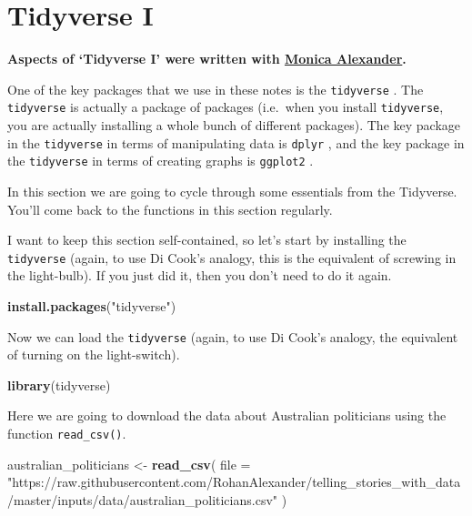 \documentclass[
]{book}
\newenvironment{Shaded}{\begin{snugshade}}{\end{snugshade}}
\newcommand{\DataTypeTok}[1]{\textcolor[rgb]{0.13,0.29,0.53}{#1}}
\newcommand{\KeywordTok}[1]{\textcolor[rgb]{0.13,0.29,0.53}{\textbf{#1}}}
\newcommand{\NormalTok}[1]{#1}
\newcommand{\StringTok}[1]{\textcolor[rgb]{0.31,0.60,0.02}{#1}}
\begin{document}
\hypertarget{tidyverse-i}{%
\section{Tidyverse I}\label{tidyverse-i}}

\textbf{Aspects of `Tidyverse I' were written with \href{https://www.monicaalexander.com/}{Monica Alexander}.}

One of the key packages that we use in these notes is the \texttt{tidyverse} \citet{tidyverse}. The \texttt{tidyverse} is actually a package of packages (i.e.~when you install \texttt{tidyverse}, you are actually installing a whole bunch of different packages). The key package in the \texttt{tidyverse} in terms of manipulating data is \texttt{dplyr} \citet{citedplyr}, and the key package in the \texttt{tidyverse} in terms of creating graphs is \texttt{ggplot2} \citet{citeggplot}.

In this section we are going to cycle through some essentials from the Tidyverse. You'll come back to the functions in this section regularly.

I want to keep this section self-contained, so let's start by installing the \texttt{tidyverse} (again, to use Di Cook's analogy, this is the equivalent of screwing in the light-bulb). If you just did it, then you don't need to do it again.

\begin{Shaded}
\begin{Highlighting}[]
\KeywordTok{install.packages}\NormalTok{(}\StringTok{"tidyverse"}\NormalTok{)}
\end{Highlighting}
\end{Shaded}

Now we can load the \texttt{tidyverse} (again, to use Di Cook's analogy, the equivalent of turning on the light-switch).

\begin{Shaded}
\begin{Highlighting}[]
\KeywordTok{library}\NormalTok{(tidyverse)}
\end{Highlighting}
\end{Shaded}

Here we are going to download the data about Australian politicians using the function \texttt{read\_csv()}.

\begin{Shaded}
\begin{Highlighting}[]
\NormalTok{australian_politicians <-}\StringTok{ }
\StringTok{  }\KeywordTok{read_csv}\NormalTok{(}
    \DataTypeTok{file =} 
      \StringTok{"https://raw.githubusercontent.com/RohanAlexander/telling_stories_with_data/master/inputs/data/australian_politicians.csv"}
\NormalTok{    )}
\end{Highlighting}
\end{Shaded}
\end{document}
